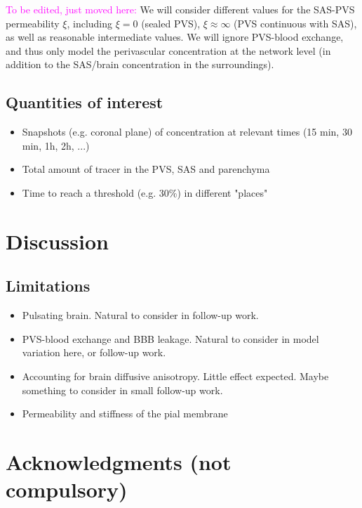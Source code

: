 \documentclass[fleqn,10pt]{wlscirep}
\newcommand{\mer}[1]{\textcolor{magenta}{#1}}
\begin{document}
\mer{To be edited, just moved here:} We will consider different values for the SAS-PVS permeability $\xi$, including $\xi = 0$ (sealed PVS), $\xi \approx \infty$ (PVS continuous with SAS), as well as reasonable intermediate values. We will ignore PVS-blood exchange, and thus only model the perivascular concentration at the network level (in addition to the SAS/brain concentration in the surroundings).  

\subsection*{Quantities of interest}

\begin{itemize}
    \item Snapshots (e.g. coronal plane) of concentration at relevant times (15 min, 30 min, 1h, 2h, ...) 
    \item Total amount of tracer in the PVS, SAS and parenchyma
     \item Time to reach a threshold (e.g. 30\%) in different "places"
\end{itemize}


\section*{Discussion}

\subsection*{Limitations}

\begin{itemize}
\item
  Pulsating brain. Natural to consider in follow-up work.
\item
  PVS-blood exchange and BBB leakage. Natural to consider in model variation here, or follow-up work.
\item
  Accounting for brain diffusive anisotropy. Little effect expected. Maybe something to consider in small follow-up work.
\item
  Permeability and stiffness of the pial membrane
\end{itemize}



\newpage
\section*{Acknowledgments (not compulsory)}
\end{document}
